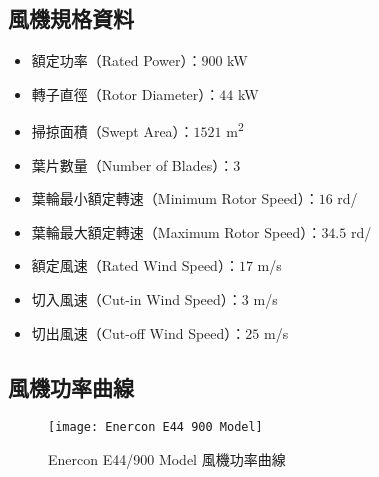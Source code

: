 \subsection*{風機規格資料}

\begin{itemize}
  \item 額定功率（Rated Power）：$900$ \si{\kW}
  \item 轉子直徑（Rotor Diameter）：$44$ \si{\kW}
  \item 掃掠面積（Swept Area）：$1521$ \si{\meter\squared}
  \item 葉片數量（Number of Blades）：$3$
  \item 葉輪最小額定轉速（Minimum Rotor Speed）：$16$ \si{rd}/\si{\min}
  \item 葉輪最大額定轉速（Maximum Rotor Speed）：$34.5$ \si{rd}/\si{\min}
  \item 額定風速（Rated Wind Speed）：$17$ \si{m}/\si{s}
  \item 切入風速（Cut-in Wind Speed）：$3$ \si{m}/\si{s}
  \item 切出風速（Cut-off Wind Speed）：$25$ \si{m}/\si{s}
\end{itemize}

\subsection*{風機功率曲線}

\begin{figure}[htbp]
  \centering
  \texttt{[image: Enercon E44 900 Model]}
  \caption{Enercon E44/900 Model 風機功率曲線}
  \label{figure: Enercon E44/900 Model}
\end{figure}
